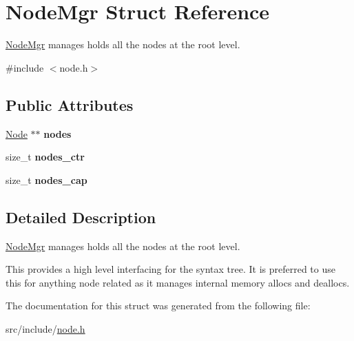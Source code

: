 \hypertarget{struct_node_mgr}{}\section{Node\+Mgr Struct Reference}
\label{struct_node_mgr}


\mbox{\hyperlink{struct_node_mgr}{Node\+Mgr}} manages holds all the nodes at the root level.  




{\ttfamily \#include $<$node.\+h$>$}

\subsection*{Public Attributes}
\begin{DoxyCompactItemize}
\item 
\mbox{\label{struct_node_mgr_ac4ee5f856f7c1eb32e3d548d3af2e5d8}} 
\mbox{\hyperlink{struct_node}{Node}} $\ast$$\ast$ {\bfseries nodes}
\item 
\mbox{\label{struct_node_mgr_a2be1be7c4f3c0b6aa1bd82aae15a5df6}} 
size\+\_\+t {\bfseries nodes\+\_\+ctr}
\item 
\mbox{\label{struct_node_mgr_a6afaf081b697ff8e8f8a670804fa9d7c}} 
size\+\_\+t {\bfseries nodes\+\_\+cap}
\end{DoxyCompactItemize}


\subsection{Detailed Description}
\mbox{\hyperlink{struct_node_mgr}{Node\+Mgr}} manages holds all the nodes at the root level. 

This provides a high level interfacing for the syntax tree. It is preferred to use this for anything node related as it manages internal memory allocs and deallocs. 

The documentation for this struct was generated from the following file\+:\begin{DoxyCompactItemize}
\item 
src/include/\mbox{\hyperlink{node_8h}{node.\+h}}\end{DoxyCompactItemize}
